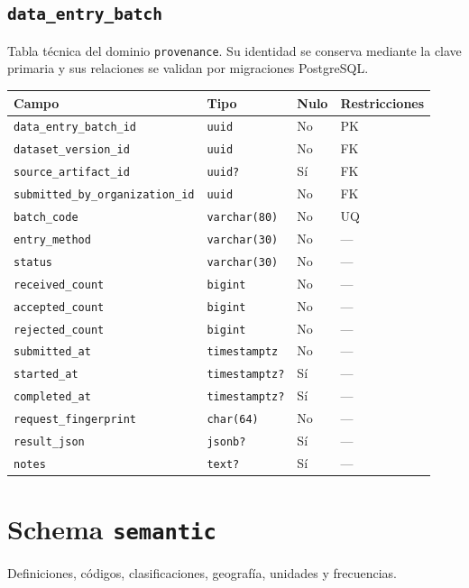 \documentclass[11pt]{article}
\begin{document}
\subsection{\texttt{data\_entry\_batch}}
Tabla técnica del dominio \texttt{provenance}. Su identidad se conserva mediante la clave primaria y sus relaciones se validan por migraciones PostgreSQL.
\begin{longtable}{>{\raggedright\arraybackslash}p{} p{} p{} p{}}
\toprule Campo & Tipo & Nulo & Restricciones \\ \midrule\endhead
\texttt{data\_entry\_batch\_id} & \texttt{uuid} & No & PK \\
\texttt{dataset\_version\_id} & \texttt{uuid} & No & FK \\
\texttt{source\_artifact\_id} & \texttt{uuid?} & Sí & FK \\
\texttt{submitted\_by\_organization\_id} & \texttt{uuid} & No & FK \\
\texttt{batch\_code} & \texttt{varchar(80)} & No & UQ \\
\texttt{entry\_method} & \texttt{varchar(30)} & No & --- \\
\texttt{status} & \texttt{varchar(30)} & No & --- \\
\texttt{received\_count} & \texttt{bigint} & No & --- \\
\texttt{accepted\_count} & \texttt{bigint} & No & --- \\
\texttt{rejected\_count} & \texttt{bigint} & No & --- \\
\texttt{submitted\_at} & \texttt{timestamptz} & No & --- \\
\texttt{started\_at} & \texttt{timestamptz?} & Sí & --- \\
\texttt{completed\_at} & \texttt{timestamptz?} & Sí & --- \\
\texttt{request\_fingerprint} & \texttt{char(64)} & No & --- \\
\texttt{result\_json} & \texttt{jsonb?} & Sí & --- \\
\texttt{notes} & \texttt{text?} & Sí & --- \\
\bottomrule\end{longtable}
\section{Schema \texttt{semantic}}
Definiciones, códigos, clasificaciones, geografía, unidades y frecuencias.
\end{document}
